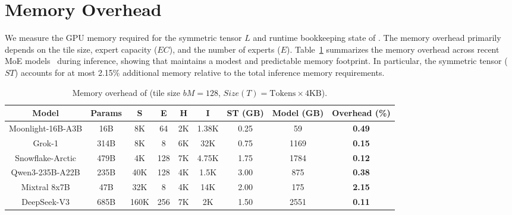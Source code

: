 \section{Memory Overhead}\label{sec:eval:memory}
We measure the GPU memory required for the symmetric tensor $L$ and runtime bookkeeping state of \sysname.
The memory overhead primarily depends on the tile size, expert capacity ($EC$), and the number of experts ($E$).
Table~\ref{tab:memory-overhead} summarizes the memory overhead across recent MoE models~\cite{moonlight,grok,snowflake-arctic,qwen3,mixtral,deepseek} during inference, showing that \sysname maintains a modest and predictable memory footprint.
In particular, the symmetric tensor ($ST$) accounts for at most 2.15\% additional memory relative to the total inference memory requirements.
\begin{table}[!ht]
    \centering
    \caption{Memory overhead of \sysname (tile size $bM = 128$, $Size(T) = \text{Tokens} \times 4\text{KB}$).}
    \label{tab:memory-overhead}
    \small
    \setlength{\tabcolsep}{5pt}
    \renewcommand{\arraystretch}{0.9}
    \begin{tabular}{ccccccccc}
        \toprule
        \textbf{Model} & \textbf{Params} & \textbf{S} & \textbf{E} & \textbf{H} & \textbf{I} & \textbf{ST (GB)} & \textbf{Model (GB)} & \textbf{Overhead (\%)} \\
        \midrule
        Moonlight-16B-A3B  & 16B  & 8K   & 64   & 2K   & 1.38K  & 0.25  & 59    & \textbf{0.49} \\
        Grok-1             & 314B & 8K   & 8    & 6K   & 32K     & 0.75  & 1169  & \textbf{0.15} \\
        Snowflake-Arctic   & 479B & 4K   & 128  & 7K   & 4.75K   & 1.75  & 1784  & \textbf{0.12} \\
        Qwen3-235B-A22B    & 235B & 40K  & 128  & 4K   & 1.5K    & 3.00  & 875   & \textbf{0.38} \\
        Mixtral 8x7B       & 47B  & 32K  & 8    & 4K   & 14K     & 2.00  & 175   & \textbf{2.15} \\
        DeepSeek-V3        & 685B & 160K & 256  & 7K   & 2K      & 1.50  & 2551  & \textbf{0.11} \\
        \bottomrule
    \end{tabular}
    \vspace{-0.4cm}
\end{table}